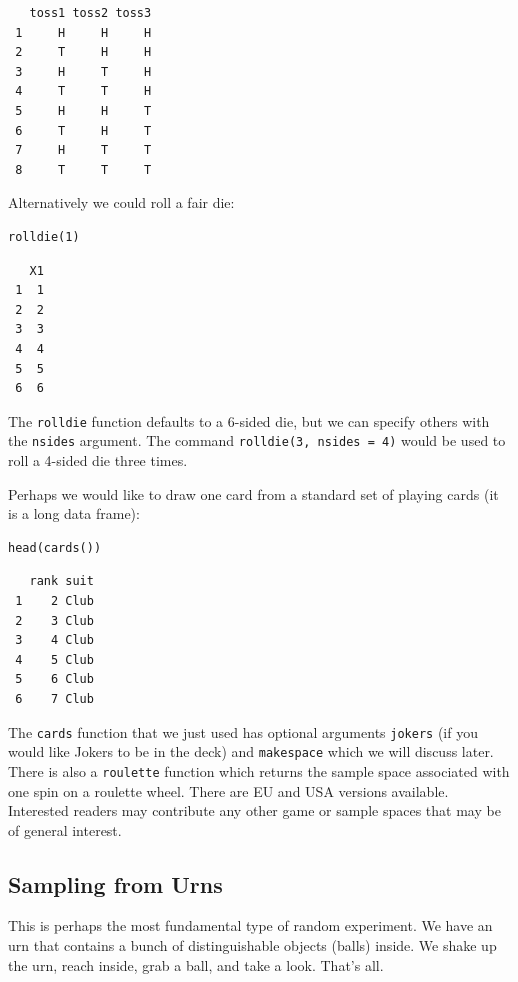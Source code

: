 \documentclass[captions=tableheading]{scrbook}
\begin{document}
\begin{verbatim}
   toss1 toss2 toss3
 1     H     H     H
 2     T     H     H
 3     H     T     H
 4     T     T     H
 5     H     H     T
 6     T     H     T
 7     H     T     T
 8     T     T     T
\end{verbatim}


Alternatively we could roll a fair die: 


\begin{verbatim}
rolldie(1)
\end{verbatim}

\begin{verbatim}
   X1
 1  1
 2  2
 3  3
 4  4
 5  5
 6  6
\end{verbatim}


The \texttt{rolldie} function defaults to a 6-sided die, but we can specify others with the \texttt{nsides} argument. The command \texttt{rolldie(3, nsides = 4)} would be used to roll a 4-sided die three times.

Perhaps we would like to draw one card from a standard set of playing cards (it is a long data frame):


\begin{verbatim}
head(cards())
\end{verbatim}

\begin{verbatim}
   rank suit
 1    2 Club
 2    3 Club
 3    4 Club
 4    5 Club
 5    6 Club
 6    7 Club
\end{verbatim}


The \texttt{cards} function that we just used has optional arguments \texttt{jokers} (if you would like Jokers to be in the deck) and \texttt{makespace} which we will discuss later. There is also a \texttt{roulette} function which returns the sample space associated with one spin on a roulette wheel. There are EU and USA versions available. Interested readers may contribute any other game or sample spaces that may be of general interest.
\subsection{Sampling from Urns}
\label{sec-4-1-1}

\label{sub:sampling-from-urns}

This is perhaps the most fundamental type of random experiment. We have an urn that contains a bunch of distinguishable objects (balls) inside. We shake up the urn, reach inside, grab a ball, and take a look. That's all.
\end{document}
